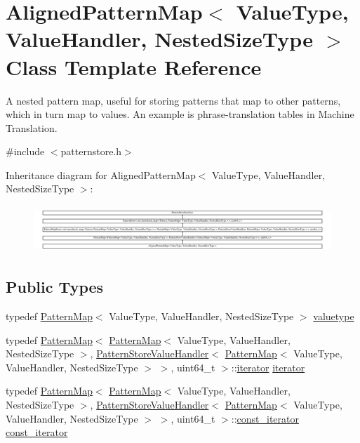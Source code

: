 \hypertarget{classAlignedPatternMap}{}\section{Aligned\+Pattern\+Map$<$ Value\+Type, Value\+Handler, Nested\+Size\+Type $>$ Class Template Reference}
\label{classAlignedPatternMap}


A nested pattern map, useful for storing patterns that map to other patterns, which in turn map to values. An example is phrase-\/translation tables in Machine Translation.  




{\ttfamily \#include $<$patternstore.\+h$>$}

Inheritance diagram for Aligned\+Pattern\+Map$<$ Value\+Type, Value\+Handler, Nested\+Size\+Type $>$\+:\begin{figure}[H]
\begin{center}
\leavevmode
\includegraphics[height=1.775523cm]{classAlignedPatternMap}
\end{center}
\end{figure}
\subsection*{Public Types}
\begin{DoxyCompactItemize}
\item 
typedef \hyperlink{classPatternMap}{Pattern\+Map}$<$ Value\+Type, Value\+Handler, Nested\+Size\+Type $>$ \hyperlink{classAlignedPatternMap_a5b139dad8d98612f62fc561a1e29153d}{valuetype}
\item 
typedef \hyperlink{classPatternMap}{Pattern\+Map}$<$ \hyperlink{classPatternMap}{Pattern\+Map}$<$ Value\+Type, Value\+Handler, Nested\+Size\+Type $>$, \hyperlink{classPatternStoreValueHandler}{Pattern\+Store\+Value\+Handler}$<$ \hyperlink{classPatternMap}{Pattern\+Map}$<$ Value\+Type, Value\+Handler, Nested\+Size\+Type $>$ $>$, uint64\+\_\+t $>$\+::\hyperlink{classAlignedPatternMap_ac784198ebf47e631d2feb1c9d6063b1b}{iterator} \hyperlink{classAlignedPatternMap_ac784198ebf47e631d2feb1c9d6063b1b}{iterator}
\item 
typedef \hyperlink{classPatternMap}{Pattern\+Map}$<$ \hyperlink{classPatternMap}{Pattern\+Map}$<$ Value\+Type, Value\+Handler, Nested\+Size\+Type $>$, \hyperlink{classPatternStoreValueHandler}{Pattern\+Store\+Value\+Handler}$<$ \hyperlink{classPatternMap}{Pattern\+Map}$<$ Value\+Type, Value\+Handler, Nested\+Size\+Type $>$ $>$, uint64\+\_\+t $>$\+::\hyperlink{classAlignedPatternMap_a1dd59a53ad5586979698949f2845a1ee}{const\+\_\+iterator} \hyperlink{classAlignedPatternMap_a1dd59a53ad5586979698949f2845a1ee}{const\+\_\+iterator}
\end{DoxyCompactItemize}
